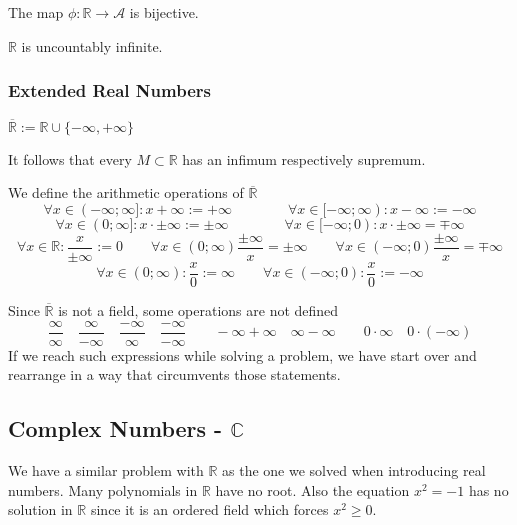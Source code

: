 \begin{theorem}\label{thm:decimal_map}
   The map \(\phi: \mathbb{R} \to \mathcal{A}\) is bijective.
\end{theorem}

\begin{proposition}[\(|\mathbb{R}| = \infty\)]\label{pro:R_uncountable}
   \(\mathbb{R}\) is uncountably infinite.
\end{proposition}

\subsubsection{Extended Real Numbers}
\begin{definition}
   \(\overline{\mathbb{R}} := \mathbb{R} \cup \{-\infty, +\infty\}\)
\end{definition}
\begin{remark}
   It follows that every \(M \subset \mathbb{R}\) has an infimum respectively supremum.
\end{remark}

\begin{definition}
   We define the arithmetic operations of \(\overline{\mathbb{R}}\)
   \[\forall x \in (-\infty; \infty]: x + \infty := +\infty \qquad\qquad \forall x \in [-\infty; \infty): x - \infty := -\infty\]
   \[\forall x \in (0; \infty]: x \cdot \pm\infty := \pm\infty \qquad\qquad \forall x \in [-\infty; 0): x \cdot \pm\infty = \mp\infty\]
   \[\forall x \in \mathbb{R}: \frac{x}{\pm\infty} := 0 \qquad \forall x \in (0; \infty) \frac{\pm\infty}{x} = \pm\infty \qquad \forall x \in (-\infty; 0) \frac{\pm\infty}{x} = \mp\infty\]
   \[\forall x \in (0; \infty): \frac{x}{0} := \infty \qquad \forall x \in (-\infty; 0): \frac{x}{0} := -\infty\]
\end{definition}

\begin{remark}
   Since \(\overline{\mathbb{R}}\) is not a field, some operations are not defined
   \[\frac{\infty}{\infty} \quad \frac{\infty}{-\infty} \quad \frac{-\infty}{\infty} \quad \frac{-\infty}{-\infty} \qquad -\infty + \infty \quad \infty - \infty \qquad 0 \cdot \infty \quad 0 \cdot (-\infty)\]
   If we reach such expressions while solving a problem, we have start over and rearrange in a way that circumvents those statements.
\end{remark}

\subsection{Complex Numbers - \texorpdfstring{\(\mathbb{C}\)}{C}}
We have a similar problem with \(\mathbb{R}\) as the one we solved when introducing real numbers.
Many polynomials in \(\mathbb{R}\) have no root.
Also the equation \(x^2 = -1\) has no solution in \(\mathbb{R}\) since it is an ordered field which forces \(x^2 \geq 0\).

